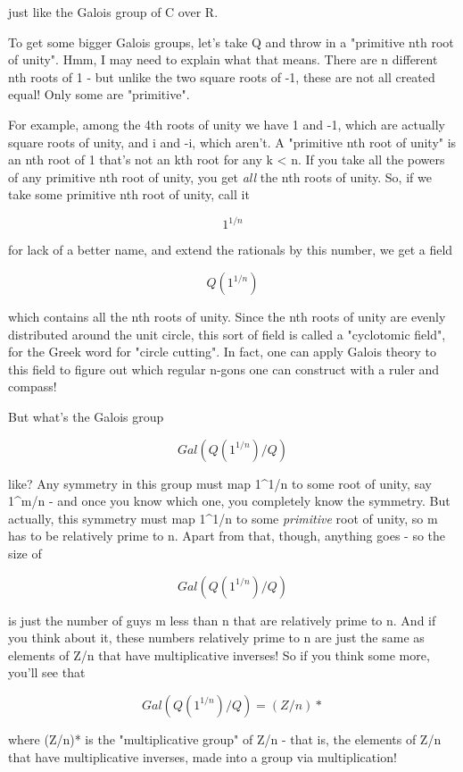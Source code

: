 just like the Galois group of C over R.  

To get some bigger Galois groups, let's take Q and throw in a "primitive 
nth root of unity".  Hmm, I may need to explain what that means.  There 
are n different nth roots of 1 - but unlike the two square roots of -1, 
these are not all created equal!  Only some are "primitive".

For example, among the 4th roots of unity we have 1 and -1, which are 
actually square roots of unity, and i and -i, which aren't.  A "primitive 
nth root of unity" is an nth root of 1 that's not an kth root for any
k < n.  If you take all the powers of any primitive nth root of unity,
you get \emph{all} the nth roots of unity.  So, if we take some primitive nth 
root of unity, call it

$$
1^{1/n}
$$
    
for lack of a better name, and extend the rationals by this number, 
we get a field

$$
Q(1^{1/n})
$$
    
which contains all the nth roots of unity.  Since the nth roots of unity
are evenly distributed around the unit circle, this sort of field is called
a "cyclotomic field", for the Greek word for "circle cutting".  In fact,
one can apply Galois theory to this field to figure out which regular
n-gons one can construct with a ruler and compass!

But what's the Galois group

$$
Gal(Q(1^{1/n})/Q)
$$
    
like?   Any symmetry in this group must map 1^{1/n} 
to some root of unity, 
say 1^{m/n} - and once you know which one, you completely know the 
symmetry.   But actually, this symmetry must map 1^{1/n} 
to some \emph{primitive}
root of unity, so m has to be relatively prime to n.  Apart from that, 
though, anything goes - so the size of 

$$
Gal(Q(1^{1/n})/Q)
$$
    
is just the number of guys m less than n that are relatively prime to n.  And 
if you think about it, these numbers relatively prime to n are just the 
same as elements of Z/n that have multiplicative inverses!  So if you think
some more, you'll see that

$$
Gal(Q(1^{1/n})/Q) = (Z/n)*
$$
    
where (Z/n)* is the "multiplicative group" of Z/n - that is, the 
elements of Z/n that have multiplicative inverses, made into a group 
via multiplication!  

